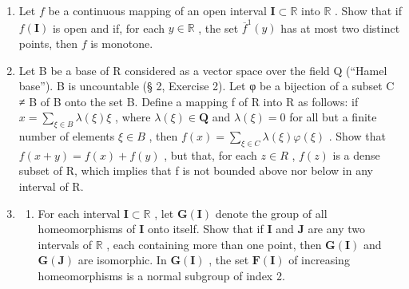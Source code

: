 \BourbakiExerciseGroup

\begin{enumerate}
\def\labelenumi{\arabic{enumi})}
\item
  Let \(f\) be a continuous mapping of an open interval \(\mathbf{I} \subset \mathbb{R}\) into \(\mathbb{R}\) . Show that if \(f(\mathbf{I})\) is open and if, for each \(y \in \mathbb{R}\) , the set \(\overline{f}^1(y)\) has at most two distinct points, then \(f\) is monotone.
\item
  Let B be a base of R considered as a vector space over the field Q (``Hamel base''). B is uncountable (§ 2, Exercise 2). Let φ be a bijection of a subset C ≠ B of B onto the set B. Define a mapping f of R into R as follows: if \(x = \sum_{\xi \in B} \lambda(\xi) \xi\) , where \(\lambda(\xi) \in \mathbf{Q}\) and \(\lambda(\xi) = 0\) for all but a finite number of elements \(\xi \in B\) , then \(f(x) = \sum_{\xi \in C} \lambda(\xi) \varphi(\xi)\) . Show that \(f(x + y) = f(x) + f(y)\) , but that, for each \(z \in R\) , \(f(z)\) is a dense subset of R, which implies that f is not bounded above nor below in any interval of R.
\item
  \begin{enumerate}
  \def\labelenumii{\alph{enumii})}
  \tightlist
  \item
    For each interval \(\mathbf{I} \subset \mathbb{R}\) , let \(\mathbf{G}(\mathbf{I})\) denote the group of all homeomorphisms of \(\mathbf{I}\) onto itself. Show that if \(\mathbf{I}\) and \(\mathbf{J}\) are any two intervals of \(\mathbb{R}\) , each containing more than one point, then \(\mathbf{G}(\mathbf{I})\) and \(\mathbf{G}(\mathbf{J})\) are isomorphic. In \(\mathbf{G}(\mathbf{I})\) , the set \(\mathbf{F}(\mathbf{I})\) of increasing homeomorphisms is a normal subgroup of index 2.
  \end{enumerate}
\end{enumerate}

